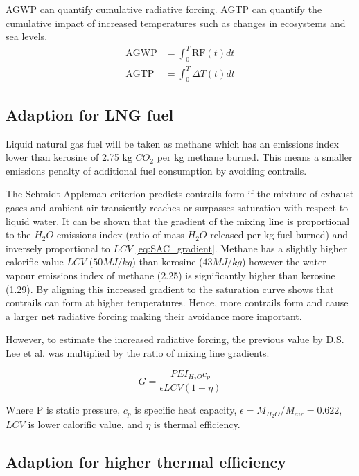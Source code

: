 \documentclass{article}
\begin{document}
AGWP can quantify cumulative radiative forcing.
AGTP can quantify the cumulative impact of increased temperatures such as changes in ecosystems and sea levels.
\begin{align}
    \text{AGWP} &= \int_0^T \text{RF}(t) dt \\
    \text{AGTP} &= \int_0^T \Delta T(t) dt
\end{align}

\subsection{Adaption for LNG fuel}

Liquid natural gas fuel will be taken as methane which has an emissions index lower than kerosine
of 2.75 kg $CO_2$ per kg methane burned.
This means a smaller emissions penalty of additional fuel consumption by avoiding contrails.

The Schmidt-Appleman criterion predicts contrails form if the mixture of exhaust gases and ambient air
transiently reaches or surpasses saturation with respect to liquid water.
It can be shown that the gradient of the mixing line is proportional to the $H_2O$ emissions index (ratio of mass $H_2O$ released per kg fuel burned) and inversely proportional to $LCV$ \ref{eq:SAC_gradient}.
Methane has a slightly higher calorific value $LCV$ ($50MJ/kg$) than kerosine ($43MJ/kg$) however the water vapour emissions index of methane (2.25) is significantly higher than kerosine (1.29).
By aligning this increased gradient to the saturation curve shows that contrails can form at higher temperatures.
Hence, more contrails form and cause a larger net radiative forcing making their avoidance more important.

However, to estimate the increased radiative forcing, the previous value by D.S. Lee et al. was multiplied by the ratio
of mixing line gradients.

\begin{equation}
    G = \frac{P EI_{H_2O} c_p}{\epsilon LCV (1-\eta)} \label{eq:SAC_gradient}
\end{equation}

Where P is static pressure, $c_p$ is specific heat capacity, $\epsilon = M_{H_2O}/M_{air} = 0.622$, $LCV$ is lower calorific value, and $\eta$ is thermal efficiency.

\subsection{Adaption for higher thermal efficiency}
\end{document}
